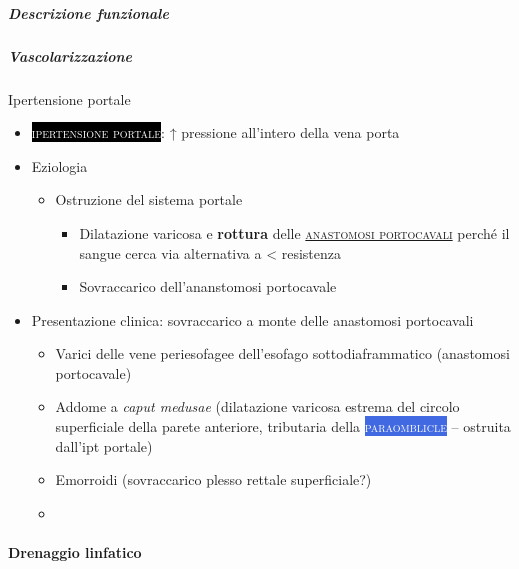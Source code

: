 \documentclass[italian,]{article}
\providecommand{\tightlist}{%
  \setlength{\itemsep}{0pt}\setlength{\parskip}{0pt}}
\newcommand{\ven}[1]{\colorbox{RoyalBlue}{\textcolor{white}{\textsc{#1}}}}
\newcommand{\pat}[1]{\colorbox{black}{\textcolor{white}{\textsc{#1}}}}
\renewcommand{\a}[1]{\underline{\textsc{#1}}}
\begin{document}
\hypertarget{descrizione-funzionale}{%
\subparagraph{Descrizione funzionale}\label{descrizione-funzionale}}

\hypertarget{vascolarizzazione-4}{%
\subparagraph{Vascolarizzazione}\label{vascolarizzazione-4}}

Ipertensione portale

\begin{itemize}
\item
  \pat{ipertensione portale}: ↑ pressione all'intero della vena porta
\item
  Eziologia

  \begin{itemize}
  \tightlist
  \item
    Ostruzione del sistema portale

    \begin{itemize}
    \tightlist
    \item
      Dilatazione varicosa e \textbf{rottura} delle
      \a{anastomosi portocavali} perché il sangue cerca via alternativa
      a \textless{} resistenza
    \item
      Sovraccarico dell'ananstomosi portocavale
    \end{itemize}
  \end{itemize}
\item
  Presentazione clinica: sovraccarico a monte delle anastomosi
  portocavali

  \begin{itemize}
  \item
    Varici delle vene periesofagee dell'esofago sottodiaframmatico
    (anastomosi portocavale)
  \item
    Addome a \emph{caput medusae} (dilatazione varicosa estrema del
    circolo superficiale della parete anteriore, tributaria della
    \ven{paraomblicle} -- ostruita dall'ipt portale)
  \item
    Emorroidi (sovraccarico plesso rettale superficiale?)
  \item
  \end{itemize}
\end{itemize}

\hypertarget{drenaggio-linfatico-2}{%
\paragraph{Drenaggio linfatico}\label{drenaggio-linfatico-2}}
\end{document}
